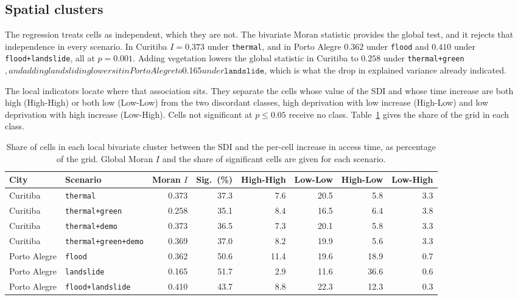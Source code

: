 \subsection{Spatial clusters}
\label{subsec:results-lisa}

The regression treats cells as independent, which they are not. The bivariate Moran statistic provides the global test, and it rejects that independence in every scenario. In Curitiba $I = 0.373$ under \texttt{thermal}, and in Porto Alegre $0.362$ under \texttt{flood} and $0.410$ under \texttt{flood+landslide}, all at $p = 0.001$. Adding vegetation lowers the global statistic in Curitiba to $0.258$ under \texttt{thermal+green}$, and adding landsliding lowers it in Porto Alegre to $0.165$ under \texttt{landslide}$, which is what the drop in explained variance already indicated.

The local indicators locate where that association sits. They separate the cells whose value of the SDI and whose time increase are both high (High-High) or both low (Low-Low) from the two discordant classes, high deprivation with low increase (High-Low) and low deprivation with high increase (Low-High). Cells not significant at $p \le 0.05$ receive no class. Table~\ref{tab:results-lisa} gives the share of the grid in each class.

\begin{table}[htbp]
\centering
\caption{Share of cells in each local bivariate cluster between the SDI and the per-cell increase in access time, as percentage of the grid. Global Moran $I$ and the share of significant cells are given for each scenario.}
\label{tab:results-lisa}
\fontsize{9}{9.6}\selectfont
\setlength{\tabcolsep}{4pt}
\begin{tabular}{llrrrrrr}
\hline
City & Scenario & Moran $I$ & Sig.\ (\%) & High-High & Low-Low & High-Low & Low-High \\
\hline
Curitiba & \texttt{thermal} & 0.373 & 37.3 & 7.6 & 20.5 & 5.8 & 3.3 \\
Curitiba & \texttt{thermal+green} & 0.258 & 35.1 & 8.4 & 16.5 & 6.4 & 3.8 \\
Curitiba & \texttt{thermal+demo} & 0.373 & 36.5 & 7.3 & 20.1 & 5.8 & 3.3 \\
Curitiba & \texttt{thermal+green+demo} & 0.369 & 37.0 & 8.2 & 19.9 & 5.6 & 3.3 \\
Porto Alegre & \texttt{flood} & 0.362 & 50.6 & 11.4 & 19.6 & 18.9 & 0.7 \\
Porto Alegre & \texttt{landslide} & 0.165 & 51.7 & 2.9 & 11.6 & 36.6 & 0.6 \\
Porto Alegre & \texttt{flood+landslide} & 0.410 & 43.7 & 8.8 & 22.3 & 12.3 & 0.3 \\
\hline
\end{tabular}
\end{table}

